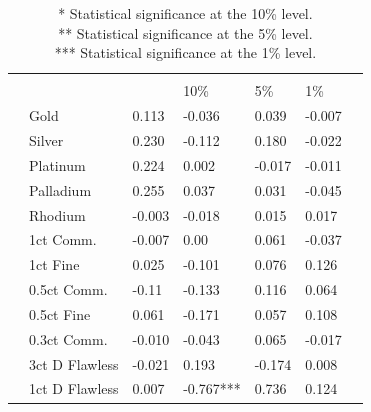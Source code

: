 \documentclass[preprint,authoryear,11pt]{elsarticle}
\begin{document}
\begin{table}[htp!]
	\caption{\newline }
	\renewcommand\arraystretch{0.65}
	\begin{tabularx}{\linewidth}{*{6}{>{\raggedleft\arraybackslash\small}p{.14\linewidth}}S[table-format=1.3]}
		\hline
		 \\
		\hline
		&     &   &  \\
		&    &        & 10\% & 5\% & 1\% \\                      
		\hline
	      & Gold       & 0.113 & -0.036  & 0.039 & -0.007 \\
                                     & Silver     & 0.230 & -0.112  & 0.180 & -0.022 \\
		                             & Platinum   & 0.224 & 0.002 & -0.017 & -0.011 \\
		                             & Palladium  & 0.255 & 0.037 & 0.031 & -0.045 \\
		                             & Rhodium    & -0.003 & -0.018 & 0.015 & 0.017 \\
		\hline
		 & 1ct Comm. & -0.007 & 0.00 & 0.061 & -0.037 \\
		                          & 1ct Fine & 0.025 & -0.101 & 0.076 & 0.126 \\
		                          & 0.5ct Comm. & -0.11 & -0.133 & 0.116 & 0.064 \\
		                          & 0.5ct Fine & 0.061 & -0.171 & 0.057 & 0.108 \\
		                          & 0.3ct Comm. & -0.010 & -0.043 & 0.065 & -0.017 \\
		                          & 3ct D Flawless & -0.021 & 0.193 & -0.174 & 0.008 \\
		                          & 1ct D Flawless & 0.007 & -0.767*** & 0.736 & 0.124 \\
		\hline
	\end{tabularx}
	\caption*{\newline
		      *   Statistical significance at the 10\% level.\\
		      **  Statistical significance at the 5\% level.\\
		      *** Statistical significance at the 1\% level.}
\end{table}
\end{document}
